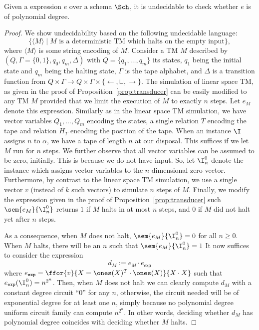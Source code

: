 \begin{Undec}
	Given a \langfor expression $e$ over a schema $\Sch$, it is undecidable to check whether $e$ is of polynomial degree.
\end{Undec}
\begin{proof}
We show undecidability based on the following undecidable language:
$$
\{ \langle M\rangle\mid \text{$M$ is a deterministic TM which halts on the empty input}\},
$$
where $\langle M\rangle$ is some string encoding of $M$.
Consider a TM $M$ described by $(Q,\Gamma=\{0,1\},q_0,q_m,\Delta)$
with $Q=\{q_1,\ldots,q_m\}$ its states, $q_1$ being the initial state and $q_m$ being
the halting state, $\Gamma$ is the tape alphabet, and $\Delta$ is a transition function
from $Q\times \Gamma\to Q\times\Gamma\times \{\leftarrow,\sqcup,\rightarrow\}$. The simulation
of linear space TM, as given in the proof of Proposition~\ref{prop:transducer} can be easily modified to
any TM $M$ provided that we limit the execution of $M$ to exactly $n$ steps. Let $e_M$ denote this expression. Similarly
as in the linear space TM simulation, we have vector variables $Q_1,\ldots,Q_m$ encoding the
states, a single relation $T$ encoding the tape and relation $H_T$ encoding the position
of the tape.  When an instance $\I$ assigns $n$ to $\alpha$, we have a tape of length $n$ at our disposal. This suffices if we let $M$ run for $n$ steps. We further observe that all vector variables can be assumed to be zero, initially.
This is because we do not have input. So, let $\I_n^0$ denote the instance which assigns vector variables to the $n$-dimensional zero vector.  Furthermore, by contrast to the linear space TM simulation, we use a single vector $v$ (instead of $k$ such vectors) to simulate $n$ steps of $M$. Finally, we modify the expression given in the proof of Proposition~\ref{prop:transducer} such $\sem{e_M}{\I_n^0}$  returns $1$ if $M$
halts in at most $n$ steps, and $0$ if $M$ did not halt yet after $n$ steps.

As a consequence, when $M$ does not halt, $\sem{e_M}{\I_n^0}=0$ for all $n\geq 0$. When $M$ halts, there will be an $n$ such that $\sem{e_M}{\I_n^0}=1$ It now suffices to consider the \langfor expression
$$
d_M:=e_M\cdot e_{\mathsf{exp}}
$$
where $e_{\texttt{exp}} = \ffor{v}{X=\ones(X)^T\cdot\ones(X)}{X\cdot X}$ such that
$e_{\texttt{exp}}(\I_n^0)=n^{2^n}$. Then, when $M$ does not halt we can clearly compute $d_M$ with a constant degree circuit ``0''
for any $n$, otherwise, the circuit needed will be of exponential degree
for at least one $n$, simply because no polynomial degree uniform  circuit family can compute $n^{2^n}$. In other words, deciding whether $d_M$ has polynomial degree coincides with deciding whether $M$ halts.
\end{proof}


%
%
%
